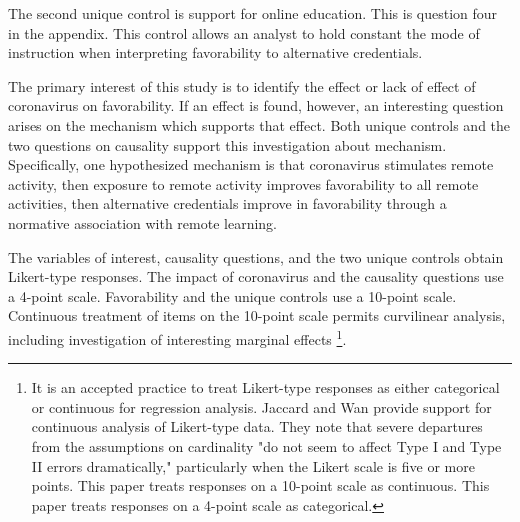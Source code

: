 \documentclass[review]{elsarticle}
\begin{document}
The second unique control is support for online education.
This is question four in the appendix.
This control allows an analyst to hold constant the mode of instruction when interpreting favorability to alternative credentials.

The primary interest of this study is to identify the effect or lack of effect of coronavirus on favorability.
If an effect is found, however, an interesting question arises on the mechanism which supports that effect.
Both unique controls and the two questions on causality support this investigation about mechanism.
Specifically, one hypothesized mechanism is that coronavirus stimulates remote activity,
then exposure to remote activity improves favorability to all remote activities,
then alternative credentials improve in favorability through a normative association with remote learning.

The variables of interest,
causality questions,
and the two unique controls obtain Likert-type responses.
The impact of coronavirus and the causality questions use a 4-point scale.
Favorability and the unique controls use a 10-point scale.
Continuous treatment of items on the 10-point scale permits curvilinear analysis,
including investigation of interesting marginal effects
\footnote{
    It is an accepted practice to treat Likert-type responses as either categorical or continuous for regression analysis.
    Jaccard and Wan provide support for continuous analysis of Likert-type data.
    They note that severe departures from the assumptions on cardinality "do not seem to affect Type I and Type II errors dramatically,"
    particularly when the Likert scale is five or more points\cite{jaccard1996lisrel}.
    This paper treats responses on a 10-point scale as continuous.
    This paper treats responses on a 4-point scale as categorical.
}.
\end{document}

